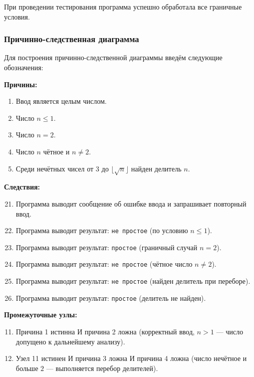 \documentclass{article}[14pt]
\begin{document}
При проведении тестирования программа успешно обработала все граничные условия.

\subsubsection{Причинно-следственная диаграмма}

Для построения причинно-следственной диаграммы введём следующие обозначения:

\textbf{Причины:}
\begin{enumerate}
    \item Ввод является целым числом.
    \item Число $n \leq 1$.
    \item Число $n = 2$.
    \item Число $n$ чётное и $n \neq 2$.
    \item Среди нечётных чисел от $3$ до $\lfloor\sqrt{n}\rfloor$ найден делитель $n$.
\end{enumerate}

\textbf{Следствия:}
\begin{enumerate}
    \setcounter{enumi}{20}
    \item Программа выводит сообщение об ошибке ввода и запрашивает повторный ввод.
    \item Программа выводит результат: \texttt{не простое} (по условию $n \leq 1$).
    \item Программа выводит результат: \texttt{простое} (граничный случай $n = 2$).
    \item Программа выводит результат: \texttt{не простое} (чётное число $n \neq 2$).
    \item Программа выводит результат: \texttt{не простое} (найден делитель при переборе).
    \item Программа выводит результат: \texttt{простое} (делитель не найден).
\end{enumerate}

\textbf{Промежуточные узлы:}
\begin{enumerate}
    \setcounter{enumi}{10}
    \item Причина 1 истинна И причина 2 ложна
          (корректный ввод, $n > 1$ — число допущено к дальнейшему анализу).
    \item Узел 11 истинен И причина 3 ложна И причина 4 ложна
          (число нечётное и больше $2$ — выполняется перебор делителей).
\end{enumerate}
\end{document}
